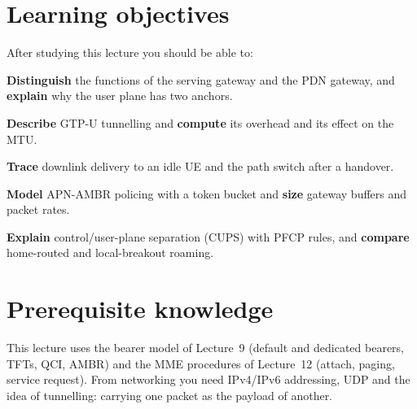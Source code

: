 \documentclass[11pt,a4paper]{article}
\begin{document}
\ACNcover

\section{Learning objectives}
After studying this lecture you should be able to:
\begin{objectives}
  \item \textbf{Distinguish} the functions of the serving gateway and the PDN gateway, and \textbf{explain}
        why the user plane has two anchors.
  \item \textbf{Describe} GTP-U tunnelling and \textbf{compute} its overhead and its effect on the MTU.
  \item \textbf{Trace} downlink delivery to an idle UE and the path switch after a handover.
  \item \textbf{Model} APN-AMBR policing with a token bucket and \textbf{size} gateway buffers and packet
        rates.
  \item \textbf{Explain} control/user-plane separation (CUPS) with PFCP rules, and \textbf{compare}
        home-routed and local-breakout roaming.
\end{objectives}

\section{Prerequisite knowledge}
This lecture uses the bearer model of Lecture~9 (default and dedicated bearers, TFTs, QCI, AMBR) and the
MME procedures of Lecture~12 (attach, paging, service request). From networking you need IPv4/IPv6
addressing, UDP and the idea of tunnelling: carrying one packet as the payload of another.
\end{document}
